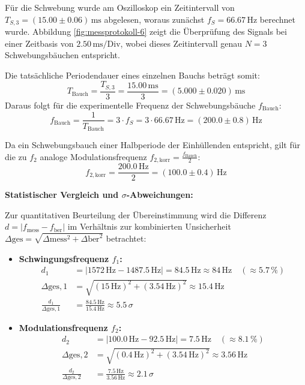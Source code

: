 \documentclass[12pt,a4paper,titlepage]{scrartcl}
\numberwithin{equation}{section}
\numberwithin{table}{section}
\numberwithin{figure}{section}
\begin{document}
Für die Schwebung wurde am Oszilloskop ein Zeitintervall von $T_{S,3} = (15.00 \pm 0.06)\,\text{ms}$ abgelesen, woraus zunächst $f_S = 66.67\,\text{Hz}$ berechnet wurde. Abbildung \ref{fig:messprotokoll-6} zeigt die Überprüfung des Signals bei einer Zeitbasis von $2.50\,\text{ms/Div}$, wobei dieses Zeitintervall genau $N = 3$ Schwebungsbäuchen entspricht. 

Die tatsächliche Periodendauer eines einzelnen Bauchs beträgt somit:
\begin{equation}
    T_{\text{Bauch}} = \frac{T_{S,3}}{3} = \frac{15.00\,\text{ms}}{3} = (5.000 \pm 0.020)\,\text{ms}
\end{equation}
Daraus folgt für die experimentelle Frequenz der Schwebungsbäuche $f_{\text{Bauch}}$:
\begin{equation}
    f_{\text{Bauch}} = \frac{1}{T_{\text{Bauch}}} = 3 \cdot f_S = 3 \cdot 66.67\,\text{Hz} = (200.0 \pm 0.8)\,\text{Hz}
\end{equation}

Da ein Schwebungsbauch einer Halbperiode der Einhüllenden entspricht, gilt für die zu $f_2$ analoge Modulationsfrequenz $f_{2,\text{korr}} = \frac{f_{\text{Bauch}}}{2}$:
\begin{equation}
    f_{2,\text{korr}} = \frac{200.0\,\text{Hz}}{2} = (100.0 \pm 0.4)\,\text{Hz}
\end{equation}

\medskip
\textbf{Statistischer Vergleich und $\sigma$-Abweichungen:}

Zur quantitativen Beurteilung der Übereinstimmung wird die Differenz $d = |f_{\text{mess}} - f_{\text{ber}}|$ im Verhältnis zur kombinierten Unsicherheit $\Delta{\text{ges}} = \sqrt{\Delta{\text{mess}}^2 + \Delta{\text{ber}}^2}$ betrachtet:

\begin{itemize}
    \item \textbf{Schwingungsfrequenz $f_1$:}
    \begin{align*}
        d_1 &= |1572\,\text{Hz} - 1487.5\,\text{Hz}| = 84.5\,\text{Hz} \approx 84\,\text{Hz} \quad (\approx 5.7\,\%) \\
        \Delta{\text{ges},1} &= \sqrt{(15\,\text{Hz})^2 + (3.54\,\text{Hz})^2} \approx 15.4\,\text{Hz} \\
        \frac{d_1}{\Delta{\text{ges},1}} &= \frac{84.5\,\text{Hz}}{15.4\,\text{Hz}} \approx 5.5\,\sigma
    \end{align*}
    
    \item \textbf{Modulationsfrequenz $f_2$:}
    \begin{align*}
        d_2 &= |100.0\,\text{Hz} - 92.5\,\text{Hz}| = 7.5\,\text{Hz} \quad (\approx 8.1\,\%) \\
        \Delta{\text{ges},2} &= \sqrt{(0.4\,\text{Hz})^2 + (3.54\,\text{Hz})^2} \approx 3.56\,\text{Hz} \\
        \frac{d_2}{\Delta{\text{ges},2}} &= \frac{7.5\,\text{Hz}}{3.56\,\text{Hz}} \approx 2.1\,\sigma
    \end{align*}
\end{itemize}
\end{document}
